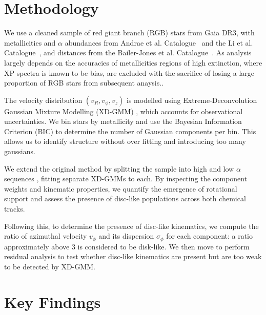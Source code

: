 \documentclass[a4paper,10pt]{article}
\begin{document}
\begin{multicols}{2}
\section*{Methodology}

We use a cleaned sample of red giant branch (RGB) stars from Gaia DR3, with metallicities and $\alpha$ abundances from Andrae et 
al. Catalogue~\cite{Andrae2023} and the Li et al. Catalogue~\cite{Li2024}, and distances from the Bailer-Jones et al. 
Catalogue~\cite{BailerJones2021}. As analysis largely depends on the accuracies of metallicities regions of high extinction, 
where XP spectra is known to be bias, are excluded with the sacrifice of losing a large proportion of RGB stars from subsequent anaysis..

The velocity distribution $(v_R, v_\phi, v_z)$ is modelled using Extreme-Deconvolution Gaussian Mixture Modelling (XD-GMM) \cite{Bovy2011}\cite{pygmmis}, 
which accounts for observational uncertainties. We bin stars by metallicity and use the Bayesian Information Criterion (BIC) to determine the 
number of Gaussian components per bin. This allows us to identify structure without over fitting and introducing too many gaussians.


We extend the original method by splitting the sample into high and low $\alpha$ sequences \citep{Vis2024}, fitting separate 
XD-GMMs to each. By inspecting the component weights and kinematic properties, we quantify the emergence of rotational support 
and assess the presence of disc-like populations across both chemical tracks.

Following this, to determine the presence of disc-like kinematics, we compute the ratio of azimuthal velocity $v_\phi$ and its 
dispersion $\sigma_\phi$ for each component: a ratio approximately above 3 is considered to be disk-like. 
We then move to perform residual analysis to test whether disc-like kinematics are present
but are too weak to be detected by XD-GMM.

\section*{Key Findings}


\end{multicols}
\end{document}
